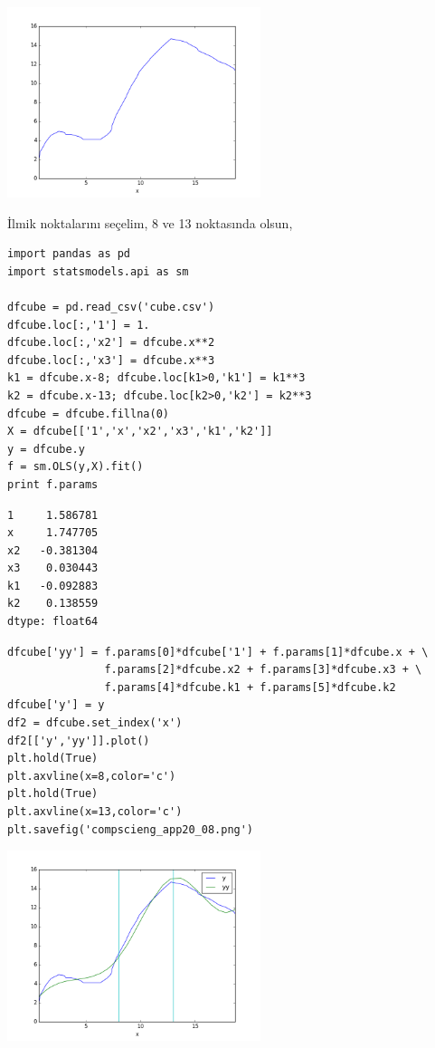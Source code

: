 \documentclass[12pt,fleqn]{article}\usepackage{../../common}
\begin{document}
\includegraphics[width=20em]{compscieng_app20_09.png}

İlmik noktalarını seçelim, 8 ve 13 noktasında olsun,

\begin{verbatim}
import pandas as pd
import statsmodels.api as sm

dfcube = pd.read_csv('cube.csv')
dfcube.loc[:,'1'] = 1.
dfcube.loc[:,'x2'] = dfcube.x**2
dfcube.loc[:,'x3'] = dfcube.x**3
k1 = dfcube.x-8; dfcube.loc[k1>0,'k1'] = k1**3
k2 = dfcube.x-13; dfcube.loc[k2>0,'k2'] = k2**3
dfcube = dfcube.fillna(0)
X = dfcube[['1','x','x2','x3','k1','k2']]
y = dfcube.y
f = sm.OLS(y,X).fit()
print f.params
\end{verbatim}

\begin{verbatim}
1     1.586781
x     1.747705
x2   -0.381304
x3    0.030443
k1   -0.092883
k2    0.138559
dtype: float64
\end{verbatim}

\begin{verbatim}
dfcube['yy'] = f.params[0]*dfcube['1'] + f.params[1]*dfcube.x + \
               f.params[2]*dfcube.x2 + f.params[3]*dfcube.x3 + \
               f.params[4]*dfcube.k1 + f.params[5]*dfcube.k2 
dfcube['y'] = y
df2 = dfcube.set_index('x')
df2[['y','yy']].plot()
plt.hold(True)
plt.axvline(x=8,color='c')
plt.hold(True)
plt.axvline(x=13,color='c')
plt.savefig('compscieng_app20_08.png')
\end{verbatim}

\includegraphics[width=20em]{compscieng_app20_08.png}
\end{document}
